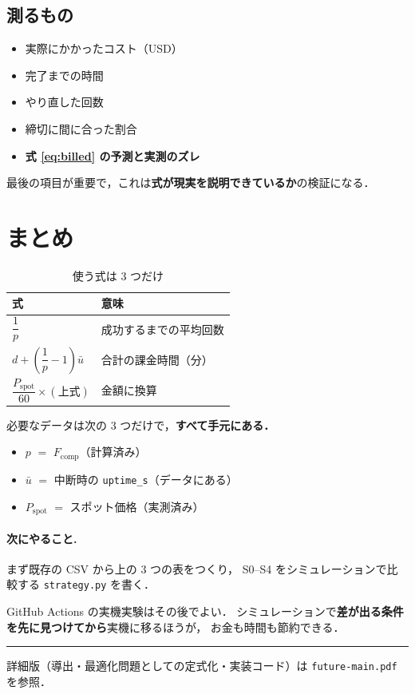 \documentclass[11pt,a4paper]{ltjsarticle}
\newcommand{\Fcomp}{F_{\mathrm{comp}}}
\newcommand{\Pspot}{P_{\mathrm{spot}}}
\begin{document}
\subsection{測るもの}

\begin{itemize}
  \item 実際にかかったコスト（USD）
  \item 完了までの時間
  \item やり直した回数
  \item 締切に間に合った割合
  \item \textbf{式 \eqref{eq:billed} の予測と実測のズレ}
\end{itemize}

最後の項目が重要で，これは\textbf{式が現実を説明できているか}の検証になる．

\section{まとめ}

\begin{table}[htbp]
\centering
\caption{使う式は 3 つだけ}
\begin{tabularx}{\textwidth}{@{}lX@{}}
\toprule
式 & 意味 \\
\midrule
$\dfrac{1}{p}$ & 成功するまでの平均回数 \\[8pt]
$d + \left(\dfrac{1}{p}-1\right)\bar u$ & 合計の課金時間（分） \\[8pt]
$\dfrac{\Pspot}{60} \times (\text{上式})$ & 金額に換算 \\
\bottomrule
\end{tabularx}
\end{table}

必要なデータは次の 3 つだけで，\textbf{すべて手元にある．}

\begin{itemize}
  \item $p$ $=$ $\Fcomp$（計算済み）
  \item $\bar u$ $=$ 中断時の \texttt{uptime\_s}（データにある）
  \item $\Pspot$ $=$ スポット価格（実測済み）
\end{itemize}

\paragraph{次にやること.}
まず既存の CSV から上の 3 つの表をつくり，
S0--S4 をシミュレーションで比較する \texttt{strategy.py} を書く．

GitHub Actions の実機実験はその後でよい．
シミュレーションで\textbf{差が出る条件を先に見つけてから}実機に移るほうが，
お金も時間も節約できる．

\vspace{1em}
\noindent
\rule{\textwidth}{0.4pt}

\noindent
\small
詳細版（導出・最適化問題としての定式化・実装コード）は
\texttt{future-main.pdf} を参照．
\end{document}
